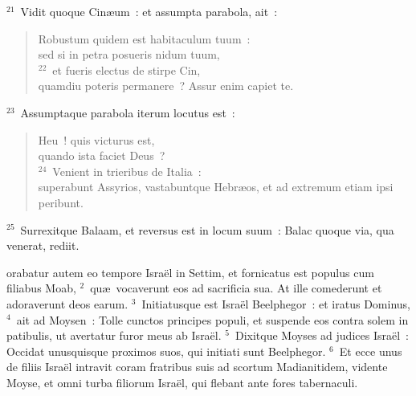 ${}^{21}$~Vidit quoque Cin\ae um~: et assumpta parabola, ait~: \begin{flushleft}\begin{verse}Robustum quidem est habitaculum tuum~:\\ sed si in petra posueris nidum tuum,\\
${}^{22}$~et fueris electus de stirpe Cin,\\ quamdiu poteris permanere~? Assur enim capiet te.\end{verse}\end{flushleft}


${}^{23}$~Assumptaque parabola iterum locutus est~: \begin{flushleft}\begin{verse}Heu~! quis victurus est,\\ quando ista faciet Deus~?\\
${}^{24}$~Venient in trieribus de Italia~:\\ superabunt Assyrios, vastabuntque Hebr\ae os, et ad extremum etiam ipsi peribunt.\end{verse}\end{flushleft}


${}^{25}$~Surrexitque Balaam, et reversus est in locum suum~: Balac quoque via, qua venerat, rediit.

\bchapter
{}orabatur autem eo tempore Isra\"el in Settim, et fornicatus est populus cum filiabus Moab,
${}^{2}$~qu\ae\ vocaverunt eos ad sacrificia sua. At ille comederunt et adoraverunt deos earum.
${}^{3}$~Initiatusque est Isra\"el Beelphegor~: et iratus Dominus,
${}^{4}$~ait ad Moysen~: Tolle cunctos principes populi, et suspende eos contra solem in patibulis, ut avertatur furor meus ab Isra\"el.
${}^{5}$~Dixitque Moyses ad judices Isra\"el~: Occidat unusquisque proximos suos, qui initiati sunt Beelphegor.
${}^{6}$~Et ecce unus de filiis Isra\"el intravit coram fratribus suis ad scortum Madianitidem, vidente Moyse, et omni turba filiorum Isra\"el, qui flebant ante fores tabernaculi.


